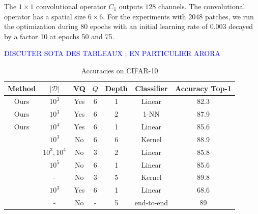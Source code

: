 \documentclass{article}
\newcommand{\Edouard}[1]{\textcolor{blue}{#1}}
\begin{document}
The $1 \times 1$ convolutional operator $C_1$ outputs $128$ channels.
The convolutional operator has a spatial size $6 \times 6$.
For the experiments with 2048 patches, we run the optimization during 80 epochs with an initial learning rate of $0.003$ decayed by a factor 10 at epochs 50 and 75.


\Edouard{DISCUTER SOTA DES TABLEAUX ; EN PARTICULIER ARORA}

\begin{table}[h]
  \caption{Accuracies on CIFAR-10}
  \label{accuracy}
  \centering
  \begin{tabular}{|c|c|c|c|c|c|c|}
    \hline 
    Method&$|\mathcal{D}|$&VQ&$Q$&Depth &Classifier& Accuracy Top-1 \\
    \hline 
    \hline 
    Ours&$10^3$ & Yes&6&1&Linear&82.3 \\
    \hline
    Ours&$10^3$ & Yes& 6&2&1-NN&87.9\\
    \hline 
    Ours&$10^4$ & Yes&6&1&Linear&85.6\\
    \hline 
    \cite{li2019enhanced}&$10^3$& No&6&6&Kernel &88.9\\
    \hline 
    \cite{mairal2016end}&$10^3, 10^4$& No&3 & 2& Linear &85.8\\
    \hline 
    \cite{recht2019imagenet}&$10^5$ & No& 6&1&Linear &85.6\\
    \hline 
    \cite{shankar2020neural}&-& No&3&5&Kernel &89.8\\
    \hline 
    \cite{coates2011analysis}&$10^3$& Yes&6 & 1&Linear &68.6\\
    \hline
    \cite{krizhevsky2012imagenet}&-& No&-&5&end-to-end&89\\
    \hline
  \end{tabular}
\end{table}
\end{document}
